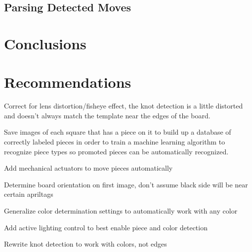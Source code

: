 \documentclass[journal]{IEEEtran}
\begin{document}
\vspace{12pt}

\subsection{Parsing Detected Moves}

\section{Conclusions}

\section{Recommendations}
Correct for lens distortion/fisheye effect, the knot detection is a little distorted and doesn't always match the template near the edges of the board.

Save images of each square that has a piece on it to build up a database of correctly labeled pieces in order to train a machine learning algorithm to recognize piece types so promoted pieces can be automatically recognized.

Add mechanical actuators to move pieces automatically

Determine board orientation on first image, don't assume black side will be near certain apriltags

Generalize color determination settings to automatically work with any color

Add active lighting control to best enable piece and color detection

Rewrite knot detection to work with colors, not edges


%
\end{document}
